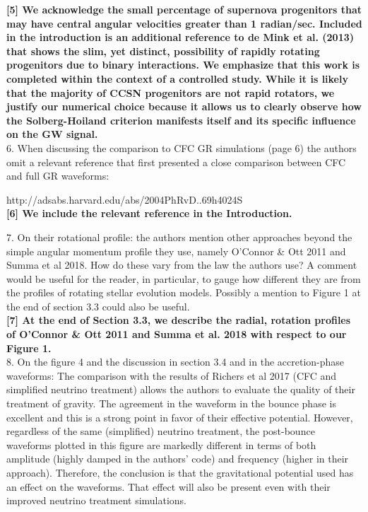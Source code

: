 \documentclass[11pt]{article}
\begin{document}
\textbf{[5] We acknowledge the small percentage of supernova progenitors that may have central angular velocities greater than 1 radian/sec.  Included in the introduction is an additional reference to de Mink et al. (2013) that shows the slim, yet distinct, possibility of rapidly rotating progenitors due to binary interactions.  We emphasize that this work is completed within the context of a controlled study.  While it is likely that the majority of CCSN progenitors are not rapid rotators, we justify our numerical choice because it allows us to clearly observe how the Solberg-Hoiland criterion manifests itself and its specific influence on the GW signal.}\\

6. When discussing the comparison to CFC GR simulations (page 6) the authors 
omit a relevant reference that first presented a close comparison between CFC 
and full GR waveforms: 

http://adsabs.harvard.edu/abs/2004PhRvD..69h4024S\\

\textbf{[6] We include the relevant reference in the Introduction.}


7. On their rotational profile: the authors mention other approaches beyond the 
simple angular momentum profile they use, namely O'Connor \& Ott 2011 and Summa et al 2018. How do these vary from the law the authors use? A comment would be useful for the reader, in particular, to gauge how different they are from the profiles of rotating stellar evolution models. Possibly a mention to Figure 1 at the end of section 3.3 could also be useful. \\

\textbf{[7] At the end of Section 3.3, we describe the radial, rotation profiles of O’Connor \& Ott 2011 and Summa et al. 2018 with respect to our Figure 1.}\\

8. On the figure 4 and the discussion in section 3.4 and in the accretion-phase 
waveforms: The comparison with the results of Richers et al 2017 (CFC and
simplified neutrino treatment) allows the authors to evaluate the quality of
their treatment of gravity. The agreement in the waveform in the bounce phase 
is excellent and this is a strong point in favor of their effective potential. 
However, regardless of the same (simplified) neutrino treatment, the post-bounce  waveforms plotted in this figure are markedly different in terms of both amplitude  (highly damped in the authors' code) and frequency (higher in their approach).  Therefore, the conclusion is that the gravitational potential used has an effect on the waveforms. That effect will also be present even with their improved neutrino treatment simulations.
\end{document}
